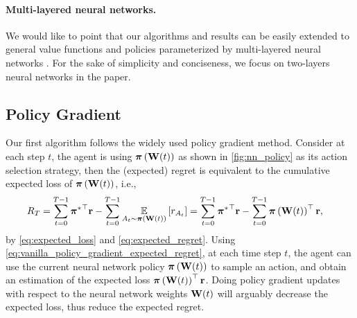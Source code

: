 
\paragraph{Multi-layered neural networks.} We would like to point that our algorithms and results can be easily extended to general value functions and policies parameterized by multi-layered neural networks \citep{allen2018convergenceA,allen2018convergenceB,du2018gradientA}. For the sake of simplicity and conciseness, we focus on two-layers neural networks in the paper.



\subsection{Policy Gradient}
\label{subsec:policy_gradient}

Our first algorithm follows the widely used policy gradient method. 
Consider at each step $t$, the agent is using ${\boldsymbol{\pi}}\left({\mathbf{W}}(t)\right)$ as shown in \cref{fig:nn_policy} as its action selection strategy, then the (expected) regret is equivalent to the cumulative expected loss of ${\boldsymbol{\pi}}\left({\mathbf{W}}(t)\right)$, i.e., 
\begin{equation}
\label{eq:vanilla_policy_gradient_expected_regret}
\begin{split}
    R_T &= \sum\limits_{t=0}^{T-1}{{{\boldsymbol{\pi}}^*}^\top {\mathbf{r}}} - \sum\limits_{t=0}^{T-1}{ \operatorname*{{\mathbb{E}}}\limits_{A_t \sim {\boldsymbol{\pi}}\left({\mathbf{W}}(t)\right)} \left[ r_{A_t} \right] } = \sum\limits_{t=0}^{T-1}{{{\boldsymbol{\pi}}^*}^\top {\mathbf{r}}} - \sum\limits_{t=0}^{T-1}{{\boldsymbol{\pi}}\left({\mathbf{W}}(t)\right)^\top {\mathbf{r}}},
\end{split}
\end{equation}
by \cref{eq:expected_loss} and \cref{eq:expected_regret}. Using \cref{eq:vanilla_policy_gradient_expected_regret}, at each time step $t$, the agent can use the current neural network policy ${\boldsymbol{\pi}}\left({\mathbf{W}}(t)\right)$ to sample an action, and obtain an estimation of the expected loss ${\boldsymbol{\pi}}\left({\mathbf{W}}(t)\right)^\top {\mathbf{r}}$. Doing policy gradient updates with respect to the neural network weights ${\mathbf{W}}(t)$ will arguably decrease the expected loss, thus reduce the expected regret. 

